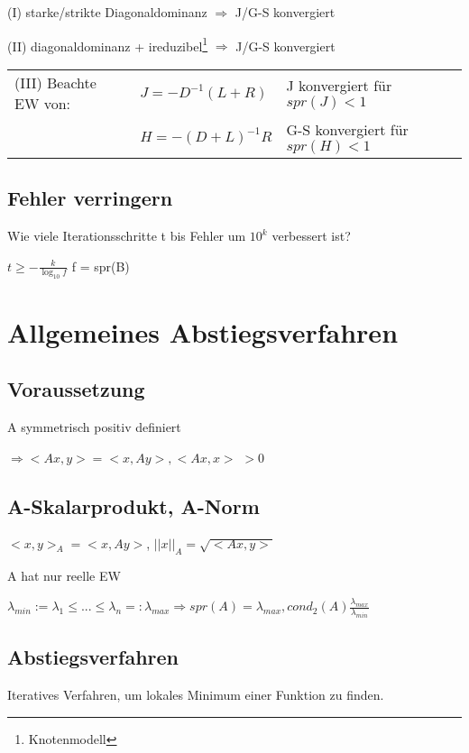 \documentclass[12pt,a4paper]{article} %
\newcommand*\tab[1][1cm]{\hspace*{#1}}
\begin{document}
	(I) starke/strikte Diagonaldominanz $\Rightarrow$ J/G-S konvergiert
	
	(II) diagonaldominanz + ireduzibel\footnote{Knotenmodell} $\Rightarrow$ J/G-S konvergiert
	
	\begin{tabular}{l l l}
		(III) Beachte EW von: & $J = -D^{-1}(L + R)$ & J konvergiert für $spr(J) < 1$ \\
		& $H = -(D + L)^{-1}R$ & G-S konvergiert für $spr(H) < 1$
	\end{tabular}
	
	\subsection{Fehler verringern}
	
	Wie viele Iterationsschritte t bis Fehler um $10^k$ verbessert ist?
	
	$t \ge -\frac{k}{\log_{10}f}$ \tab f = spr(B)
	
	\newpage
	
	\section{Allgemeines Abstiegsverfahren}
	
	\subsection{Voraussetzung}
	
	A symmetrisch positiv definiert
	
	$\Rightarrow <Ax, y> = <x, Ay>, <Ax, x>$ $> 0$
	
	\subsection{A-Skalarprodukt, A-Norm}
	
	$<x, y>_A = <x, Ay>$, $||x||_A = \sqrt{<Ax, y>}$
	
	A hat nur reelle EW
	
	$\lambda_{min} := \lambda_1 \le ... \le \lambda_n =: \lambda_{max} \Rightarrow spr(A) = \lambda_{max}, cond_2(A) \frac{\lambda_{max}}{\lambda_{min}}$
	
	\subsection{Abstiegsverfahren}
	
	Iteratives Verfahren, um lokales Minimum einer Funktion zu finden.
	
\end{document}
